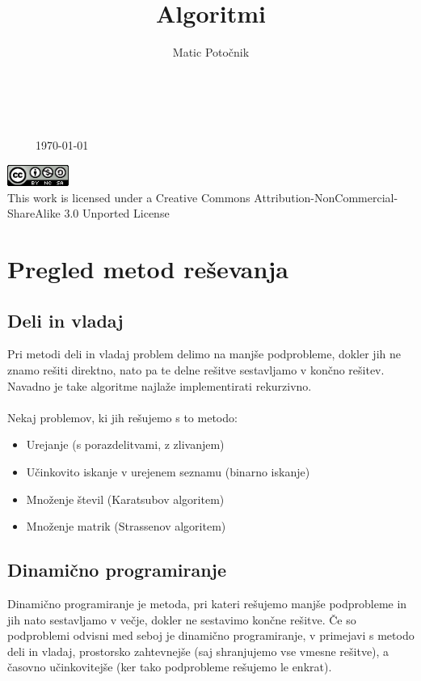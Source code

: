 \documentclass[10pt,a4paper,oneside]{book}
\title{Algoritmi}
\author{Matic Potočnik}
\newenvironment{items}{
\begin{itemize}
  \setlength{\itemsep}{1pt}
  \setlength{\parskip}{0pt}
  \setlength{\parsep}{0pt}
}{\end{itemize}}
\begin{document}
\begin{titlepage}
\begin{center}
\ \\[5cm]
{}\\[-16pt]
{\ \ \ \ \ \huge \today}


\vfill
\parbox{7.5cm}{
\begin{center}
\includegraphics[width=0.15\textwidth]{./CC}\\[6pt]

This work is licensed under a Creative Commons Attribution-NonCommercial-ShareAlike 3.0 Unported License
\end{center}
}

\end{center}
\end{titlepage}
\tableofcontents
\pagebreak
\chapter{Pregled metod reševanja}
\section{Deli in vladaj}
Pri metodi deli in vladaj problem delimo na manjše podprobleme, dokler jih ne znamo rešiti direktno, nato pa te delne rešitve sestavljamo v končno rešitev. Navadno je take algoritme najlaže implementirati rekurzivno.\\
 \\
Nekaj problemov, ki jih rešujemo s to metodo:
\begin{items}
	\item Urejanje (s porazdelitvami, z zlivanjem)
	\item Učinkovito iskanje v urejenem seznamu (binarno iskanje)
	\item Množenje števil (Karatsubov algoritem)
	\item Množenje matrik (Strassenov algoritem)
\end{items}

\section{Dinamično programiranje}
Dinamično programiranje je metoda, pri kateri rešujemo manjše podprobleme in jih nato sestavljamo v večje, dokler ne sestavimo končne rešitve. Če so podproblemi odvisni med seboj je dinamično programiranje, v primejavi s metodo deli in vladaj, prostorsko zahtevnejše (saj shranjujemo vse vmesne rešitve), a časovno učinkovitejše (ker tako podprobleme rešujemo le enkrat).
\end{document}
